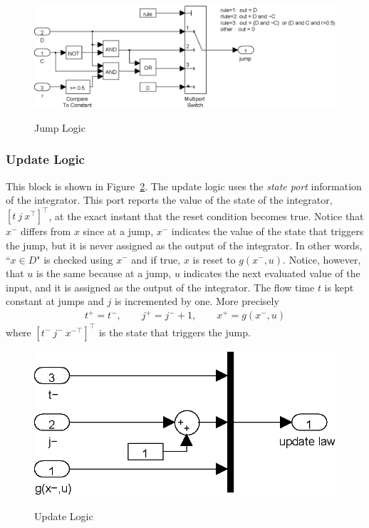 \documentclass{article}
\begin{document}
\begin{figure}[ht]
  \begin{center}
    {\includegraphics[width=.8\textwidth]{figures/Simulink/JumpLogic.eps}}
   \caption{Jump Logic}
\label{fig:JumpLogic}
  \end{center}
\end{figure}


\subsubsection{Update Logic}

This block is shown in Figure~\ref{fig:UpdateLogic}. The update logic uses the {\em state port} information of the integrator. This port reports the value of the state of the integrator, $[t\ j\ x^\top]^\top$, at the exact instant that the reset condition becomes true. Notice that $x^-$ differs from $x$ since at a jump, $x^-$ indicates the value of the state that triggers the jump, but it is never assigned as the output of the integrator. In other words, ``$x \in D$" is checked using $x^-$ and if true, $x$ is reset to $g(x^-,u)$. Notice, however, that $u$ is the same because at a jump, $u$ indicates the next evaluated value of the input, and it is assigned as the output of the integrator. The flow time $t$ is kept constant at jumps and $j$ is incremented by one. More precisely
\begin{eqnarray*}
t^+=t^-, \qquad j^+=j^-+1,\qquad x^+=g(x^-,u)
\end{eqnarray*}
where $[t^-\ j^-\ {x^-}^\top]^\top$ is the state that triggers the jump.

\begin{figure}[ht]
  \begin{center}
    {\includegraphics[width=.4\textwidth]{figures/Simulink/UpdateLogic.eps}}
   \caption{Update Logic}
\label{fig:UpdateLogic}
  \end{center}
\end{figure}
\end{document}
